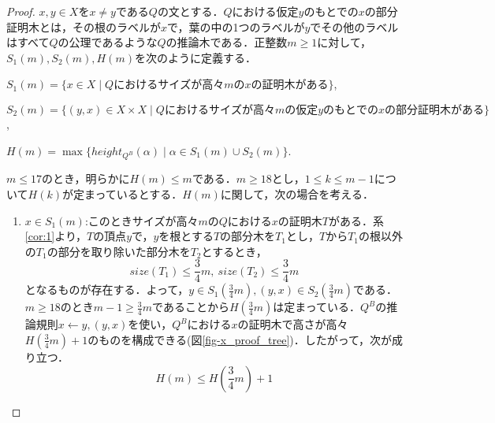 \begin{proof}%

  $x,y\in X$を$x\neq y$である$Q$の文とする．$Q$における仮定$y$のもとでの$x$の部分証明木とは，その根のラベルが$x$で，葉の中の1つのラベルが$y$でその他のラベルはすべて$Q$の公理であるような$Q$の推論木である．正整数$m\geq1$に対して，$S_1(m),S_2(m),H(m)$を次のように定義する．

    $S_1(m)=\{x\in X\mid Qにおけるサイズが高々mのxの証明木がある\}$,

    $S_2(m)=\{(y,x)\in X\times X\mid Qにおけるサイズが高々mの仮定yのもとでのxの部分証明木がある\}$,

    $H(m)=\max\{height_{Q^{B}}(\alpha)\mid\alpha\in S_1(m)\cup S_2(m)\}$.


  $m\leq 17$のとき，明らかに$H(m)\leq m$である．$m\geq 18$とし，$1\leq k\leq m-1$について$H(k)$が定まっているとする．$H(m)$に関して，次の場合を考える．
\begin{enumerate}
  \item $x\in S_1(m)$:このときサイズが高々$m$の$Q$における$x$の証明木$T$がある．系\ref{cor:1}より，$T$の頂点$y$で，$y$を根とする$T$の部分木を$T_1$とし，$T$から$T_1$の根以外の$T_1$の部分を取り除いた部分木を$T_2$とするとき，
  $$size(T_1)\leq\frac{3}{4}m, ~size(T_2)\leq\frac{3}{4}m$$
  となるものが存在する．よって，$y\in S_1(\frac{3}{4}m),(y,x)\in S_2(\frac{3}{4}m)$である．$m\geq18$のとき$m-1\geq\frac{3}{4}m$であることから$H(\frac{3}{4}m)$は定まっている．$Q^{B}$の推論規則$x\leftarrow y,(y,x)$を使い，$Q^{B}$における$x$の証明木で高さが高々$H(\frac{3}{4}m)+1$のものを構成できる(図\ref{fig-x_proof_tree})．したがって，次が成り立つ．
  $$H(m)\leq H(\frac{3}{4}m)+1$$


\end{enumerate}
\end{proof}
